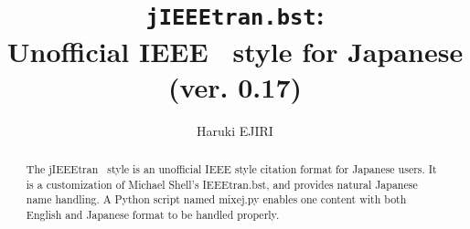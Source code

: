 \documentclass[11pt, a4paper, dvipdfmx]{article}
\title{\texttt{jIEEEtran.bst}:\\Unofficial IEEE \BibTeX\ style for Japanese\\(ver. 0.17)}
\author{Haruki EJIRI}
\begin{document}
\maketitle

\begin{abstract}
The jIEEEtran \BibTeX\ style is an unofficial IEEE style citation format for Japanese users.
It is a customization of Michael Shell's IEEEtran.bst, and provides natural Japanese name handling.
A Python script named mixej.py enables one content with both English and Japanese format to be handled properly.
\end{abstract}
\end{document}
